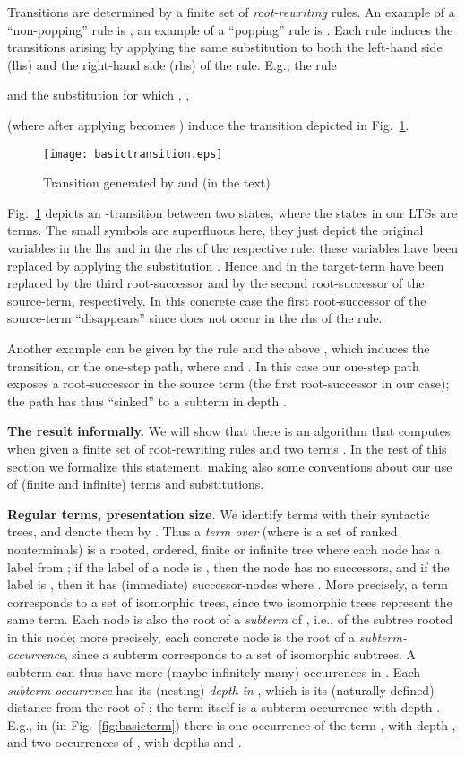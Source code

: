 \documentclass{llncs}
\begin{document}
Transitions are determined by a finite set of 
\emph{root-rewriting} rules. 
An example of a ``non-popping'' rule 
is , an
example of a ``popping'' rule is .
Each rule induces the transitions arising by applying the same
substitution  to both the left-hand side (lhs) and the
right-hand side (rhs) of the rule. E.g., 
the rule  
\begin{center}
 and the substitution
 for which
,
,
 
\end{center}
(where
 after applying  becomes 
) induce the transition 
 depicted
in Fig.~\ref{fig:basictransition}.
\begin{figure}[t]
\centering
\texttt{[image: basictransition.eps]}
\caption{Transition generated by 
	 and  (in the
text)}
\label{fig:basictransition}
\end{figure}
Fig.~\ref{fig:basictransition} depicts an -transition between two states, where 
the states in our LTSs are terms.
The small symbols  are superfluous here, they just 
  depict the original variables in the lhs and in the rhs
of the respective rule; these variables have been replaced by applying
the substitution .
Hence  and  in the target-term have been replaced by the third root-successor and by the second
root-successor of the source-term, respectively. In this concrete case
the first root-successor of the source-term ``disappears'' since 
 does not occur in the rhs of the rule.

Another example can be given by the rule 
 and the above , which induces 
the transition, or the one-step path,
 where  and 
.
In this case our one-step path 
exposes a root-successor
 in the
source term 
(the first root-successor in our case);
the path has thus ``sinked'' to a subterm in depth .

\textbf{The result informally.}
We will show that there is an algorithm that computes
 when given a finite set of root-rewriting rules
and two terms .
In the rest of this section we formalize this statement,
 making also
some conventions about our use of (finite and infinite) 
terms and substitutions.

\textbf{Regular terms, presentation size.}
We identify terms with their syntactic trees, and denote them by
. Thus a \emph{term  over}
 (where  is a set of ranked nonterminals) 
is a rooted, ordered, finite or infinite tree where each node
has a label from ; if the label of a node is , 
then the node has no successors, and if the label is , then 
it has  (immediate) successor-nodes where .
More precisely, a term corresponds to a set of isomorphic trees, since
two isomorphic trees represent the same term.
Each node is also the root of a \emph{subterm} of , i.e., of the
subtree rooted in this node; more precisely, each concrete node 
is the root of a \emph{subterm-occurrence}, 
since a subterm corresponds to a set of isomorphic subtrees.
A subterm can thus have more (maybe infinitely
many) occurrences in . Each \emph{subterm-occurrence} has
its (nesting) \emph{depth in} , which is its (naturally defined) 
distance from the root of ; the term  itself is a
subterm-occurrence with depth .
E.g., in  
(in Fig.~\ref{fig:basicterm})
there 
is one occurrence of the
term , with depth , and two occurrences of , with
depths  and .
\end{document}
